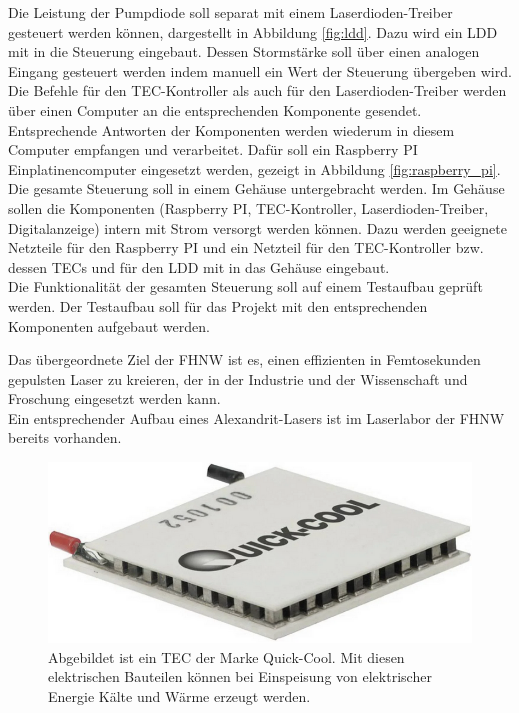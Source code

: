 Die Leistung der Pumpdiode soll separat mit einem Laserdioden-Treiber gesteuert werden können, dargestellt in Abbildung \ref{fig:ldd}. Dazu wird ein LDD mit in die Steuerung eingebaut. Dessen Stormstärke soll über einen analogen Eingang gesteuert werden indem manuell ein Wert der Steuerung übergeben wird.\\
Die Befehle für den TEC-Kontroller als auch für den Laserdioden-Treiber werden über einen Computer an die entsprechenden Komponente gesendet. Entsprechende Antworten der Komponenten werden wiederum in diesem Computer empfangen und verarbeitet. Dafür soll ein Raspberry PI Einplatinencomputer eingesetzt werden, gezeigt in Abbildung \ref{fig:raspberry_pi}.\\

Die gesamte Steuerung soll in einem Gehäuse untergebracht werden. Im Gehäuse sollen die Komponenten  (Raspberry PI, TEC-Kontroller, Laserdioden-Treiber, Digitalanzeige) intern mit Strom versorgt werden können. Dazu werden geeignete Netzteile für den Raspberry PI und ein Netzteil für den TEC-Kontroller bzw. dessen TECs und für den LDD mit in das Gehäuse eingebaut.\\
Die Funktionalität der gesamten Steuerung soll auf einem Testaufbau geprüft werden. Der Testaufbau soll für das Projekt mit den entsprechenden Komponenten aufgebaut werden.\\
\label{chptr:_einleitung}

Das übergeordnete Ziel der FHNW ist es, einen effizienten in Femtosekunden gepulsten Laser zu kreieren, der in der Industrie und der Wissenschaft und Froschung eingesetzt werden kann.\\
Ein entsprechender Aufbau eines Alexandrit-Lasers ist im Laserlabor der FHNW bereits vorhanden.\\

\begin{figure}[H]
    \centering
    \includegraphics[scale=0.5]{98_images/peltier_modul.PNG}
    \caption{Abgebildet ist ein TEC der Marke Quick-Cool. Mit diesen elektrischen Bauteilen können bei Einspeisung von elektrischer Energie Kälte und Wärme erzeugt werden.}
    \label{fig:peltierelement}
\end{figure}

